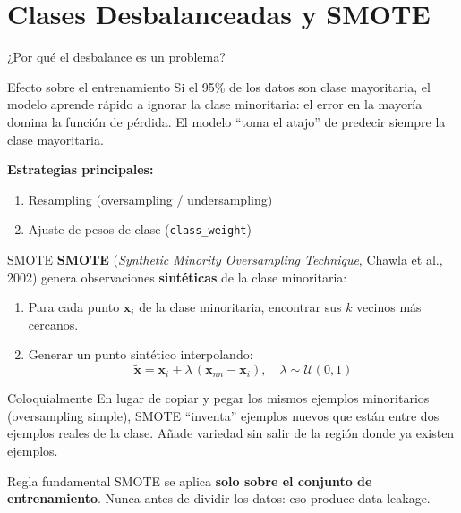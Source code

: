 \documentclass[aspectratio=169]{beamer}
\newcommand{\bx}{\bm{x}}
\begin{document}
\section{Clases Desbalanceadas y SMOTE}

\begin{frame}{¿Por qué el desbalance es un problema?}
  \begin{block}{Efecto sobre el entrenamiento}
    Si el 95\% de los datos son clase mayoritaria, el modelo aprende rápido a
    ignorar la clase minoritaria: el error en la mayoría domina la función de pérdida.
    El modelo ``toma el atajo'' de predecir siempre la clase mayoritaria.
  \end{block}

  \medskip
  \textbf{Estrategias principales:}
  \begin{enumerate}
    \item Resampling (oversampling / undersampling)
    \item Ajuste de pesos de clase (\texttt{class\_weight})
  \end{enumerate}
\end{frame}

\begin{frame}{SMOTE}
  \textbf{SMOTE} (\textit{Synthetic Minority Oversampling Technique}, Chawla et al., 2002)
  genera observaciones \textbf{sintéticas} de la clase minoritaria:

  \medskip
  \begin{enumerate}
    \item Para cada punto $\bx_i$ de la clase minoritaria, encontrar sus $k$ vecinos más cercanos.
    \item Generar un punto sintético interpolando:
    \[
      \tilde{\bx} = \bx_i + \lambda\,(\bx_{nn} - \bx_i), \quad \lambda \sim \mathcal{U}(0,1)
    \]
  \end{enumerate}

  \medskip
  \begin{exampleblock}{Coloquialmente}
    En lugar de copiar y pegar los mismos ejemplos minoritarios (oversampling simple),
    SMOTE ``inventa'' ejemplos nuevos que están entre dos ejemplos reales de la clase.
    Añade variedad sin salir de la región donde ya existen ejemplos.
  \end{exampleblock}

  \medskip
  \begin{alertblock}{Regla fundamental}
    SMOTE se aplica \textbf{solo sobre el conjunto de entrenamiento}.
    Nunca antes de dividir los datos: eso produce data leakage.
  \end{alertblock}
\end{frame}
\end{document}
